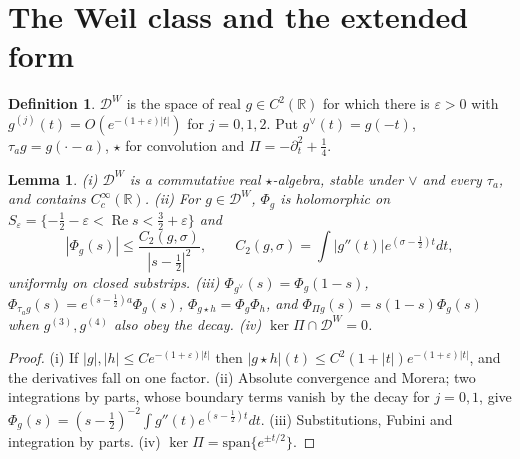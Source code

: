 \documentclass[11pt]{amsart}
\newtheorem{lemma}[theorem]{Lemma}
\theoremstyle{definition}
\newtheorem{definition}[theorem]{Definition}
\theoremstyle{remark}
\newcommand{\R}{\mathbb R}
\newcommand{\Rel}{\operatorname{Re}}
\newcommand{\DW}{\mathcal D^{W}}
\begin{document}
\section{The Weil class and the extended form}\label{sec:form}

\begin{definition}\label{def:DW}
$\DW$ is the space of real $g\in C^2(\R)$ for which there is $\varepsilon>0$ with
$g^{(j)}(t)=O(e^{-(1+\varepsilon)|t|})$ for $j=0,1,2$. Put $g^\vee(t)=g(-t)$, $\tau_ag=g(\cdot-a)$,
$\star$ for convolution and $\Pi=-\partial_t^2+\frac14$.
\end{definition}

\begin{lemma}\label{lem:DW}
(i) $\DW$ is a commutative real $\star$-algebra, stable under $\vee$ and every $\tau_a$, and contains
$C_c^\infty(\R)$. (ii) For $g\in\DW$, $\Phi_g$ is holomorphic on
$S_\varepsilon=\{-\frac12-\varepsilon<\Rel s<\frac32+\varepsilon\}$ and
\begin{equation}\label{eq:decay}
|\Phi_g(s)|\le\frac{C_2(g,\sigma)}{|s-\frac12|^2},\qquad C_2(g,\sigma)=\int|g''(t)|e^{(\sigma-\frac12)t}dt,
\end{equation}
uniformly on closed substrips. (iii) $\Phi_{g^\vee}(s)=\Phi_g(1-s)$, $\Phi_{\tau_ag}(s)=e^{(s-\frac12)a}\Phi_g(s)$,
$\Phi_{g\star h}=\Phi_g\Phi_h$, and $\Phi_{\Pi g}(s)=s(1-s)\Phi_g(s)$ when $g^{(3)},g^{(4)}$ also obey the decay.
(iv) $\ker\Pi\cap\DW=0$.
\end{lemma}
\begin{proof}
(i) If $|g|,|h|\le Ce^{-(1+\varepsilon)|t|}$ then $|g\star h|(t)\le C^2(1+|t|)e^{-(1+\varepsilon)|t|}$, and the
derivatives fall on one factor. (ii) Absolute convergence and Morera; two integrations by parts, whose
boundary terms vanish by the decay for $j=0,1$, give $\Phi_g(s)=(s-\frac12)^{-2}\int g''(t)e^{(s-\frac12)t}dt$.
(iii) Substitutions, Fubini and integration by parts. (iv) $\ker\Pi=\mathrm{span}\{e^{\pm t/2}\}$.
\end{proof}
\end{document}
